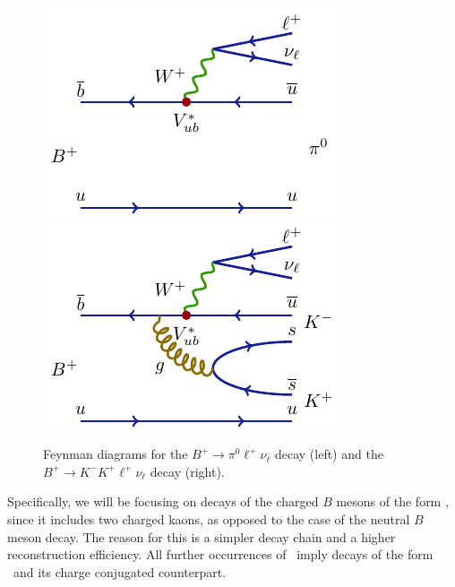 \begin{figure}[H]
	\centering
	\includegraphics{texfig/B2pilnu}
	\hspace{1cm}
	\includegraphics{texfig/B2KKlnu}
	\captionsetup{width=.8\linewidth}
	\caption{Feynman diagrams for the $B^+ \to \pi^0 \ell^+ \nu_\ell$ decay (left) and the $B^+ \to K^- K^+ \ell^+ \nu_\ell$ decay (right).}
	\label{feynman}
\end{figure}

Specifically, we will be focusing on decays of the charged $B$ mesons of the form \decayb, since it includes two charged kaons, as opposed to the case of the neutral $B$ meson decay. The reason for this is a simpler decay chain and a higher reconstruction efficiency. All further occurrences of \decaya~imply decays of the form \decayb~and its charge conjugated counterpart.